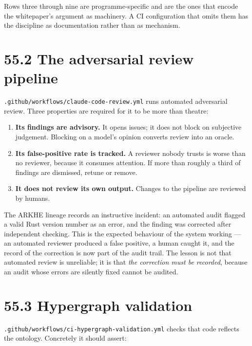 \documentclass[
  11pt]{report}
\providecommand{\tightlist}{%
  \setlength{\itemsep}{0pt}\setlength{\parskip}{0pt}}
\begin{document}
Rows three through nine are programme-specific and are the ones that
encode the whitepaper's argument as machinery. A CI configuration that
omits them has the discipline as documentation rather than as mechanism.

\hypertarget{the-adversarial-review-pipeline}{%
\section{55.2 The adversarial review
pipeline}\label{the-adversarial-review-pipeline}}

\texttt{.github/workflows/claude-code-review.yml} runs automated
adversarial review. Three properties are required for it to be more than
theatre:

\begin{enumerate}
\def\labelenumi{\arabic{enumi}.}
\tightlist
\item
  \textbf{Its findings are advisory.} It opens issues; it does not block
  on subjective judgement. Blocking on a model's opinion converts review
  into an oracle.
\item
  \textbf{Its false-positive rate is tracked.} A reviewer nobody trusts
  is worse than no reviewer, because it consumes attention. If more than
  roughly a third of findings are dismissed, retune or remove.
\item
  \textbf{It does not review its own output.} Changes to the pipeline
  are reviewed by humans.
\end{enumerate}

The ARKHE lineage records an instructive incident: an automated audit
flagged a valid Rust version number as an error, and the finding was
corrected after independent checking. This is the expected behaviour of
the system working --- an automated reviewer produced a false positive,
a human caught it, and the record of the correction is now part of the
audit trail. The lesson is not that automated review is unreliable; it
is that \emph{the correction must be recorded}, because an audit whose
errors are silently fixed cannot be audited.

\hypertarget{hypergraph-validation}{%
\section{55.3 Hypergraph validation}\label{hypergraph-validation}}

\texttt{.github/workflows/ci-hypergraph-validation.yml} checks that code
reflects the ontology. Concretely it should assert:
\end{document}
